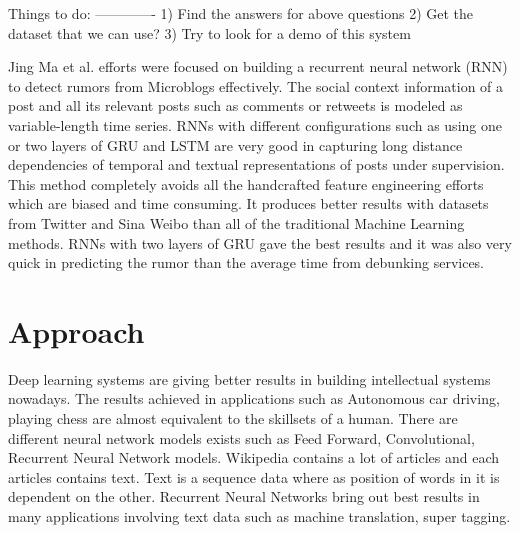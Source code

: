 \documentclass[a4paper, 11pt]{article}
\begin{document}
Things to do:
-------------
1) Find the answers for above questions
2) Get the dataset that we can use?
3) Try to look for a demo of this system

Jing Ma et al. efforts were focused on building a recurrent neural network (RNN) to detect rumors from Microblogs effectively. The social context information of a post and all its relevant posts such as comments or retweets is modeled as variable-length time series.  RNNs with different configurations such as using one or two layers of GRU and LSTM are very good in capturing long distance dependencies of temporal and textual representations of posts under supervision. This method completely avoids all the handcrafted feature engineering efforts which are biased and time consuming. It produces better results with datasets from Twitter and Sina Weibo than all of the traditional Machine Learning methods. RNNs with two layers of GRU gave the best results and it was also very quick in predicting the rumor than the average time from debunking services.  





\section{Approach}

Deep learning systems are giving better results in building intellectual systems nowadays.\cite{Goldberg2016} The results achieved in applications such as Autonomous car driving, playing chess are almost equivalent to the skillsets of a human. There are different neural network models exists such as Feed Forward, Convolutional, Recurrent Neural Network models. Wikipedia contains a lot of articles and each articles contains text. Text is a sequence data where as position of words in it is dependent on the other. Recurrent Neural Networks bring out best results in many applications involving text data such as machine translation, super tagging.
\end{document}
